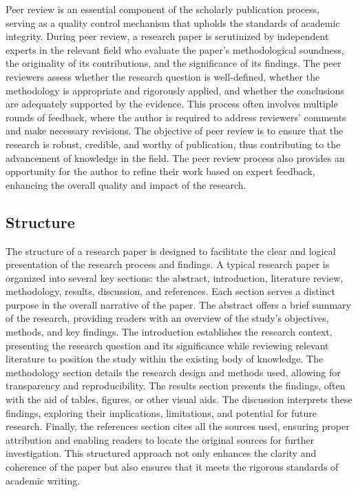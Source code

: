 \documentclass[
]{book}
\begin{document}
Peer review is an essential component of the scholarly publication process, serving as a quality control mechanism that upholds the standards of academic integrity. During peer review, a research paper is scrutinized by independent experts in the relevant field who evaluate the paper's methodological soundness, the originality of its contributions, and the significance of its findings. The peer reviewers assess whether the research question is well-defined, whether the methodology is appropriate and rigorously applied, and whether the conclusions are adequately supported by the evidence. This process often involves multiple rounds of feedback, where the author is required to address reviewers' comments and make necessary revisions. The objective of peer review is to ensure that the research is robust, credible, and worthy of publication, thus contributing to the advancement of knowledge in the field. The peer review process also provides an opportunity for the author to refine their work based on expert feedback, enhancing the overall quality and impact of the research.

\subsection*{Structure}\label{structure}

The structure of a research paper is designed to facilitate the clear and logical presentation of the research process and findings. A typical research paper is organized into several key sections: the abstract, introduction, literature review, methodology, results, discussion, and references. Each section serves a distinct purpose in the overall narrative of the paper. The abstract offers a brief summary of the research, providing readers with an overview of the study's objectives, methods, and key findings. The introduction establishes the research context, presenting the research question and its significance while reviewing relevant literature to position the study within the existing body of knowledge. The methodology section details the research design and methods used, allowing for transparency and reproducibility. The results section presents the findings, often with the aid of tables, figures, or other visual aids. The discussion interprets these findings, exploring their implications, limitations, and potential for future research. Finally, the references section cites all the sources used, ensuring proper attribution and enabling readers to locate the original sources for further investigation. This structured approach not only enhances the clarity and coherence of the paper but also ensures that it meets the rigorous standards of academic writing.
\end{document}
